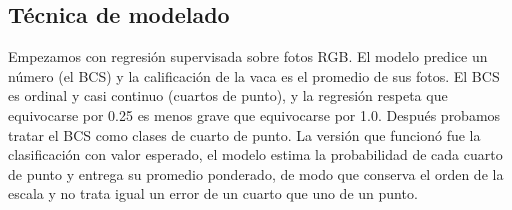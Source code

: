 \subsection{Técnica de modelado}

Empezamos con regresión supervisada sobre fotos RGB. El modelo predice un número (el BCS) y la calificación de la vaca es el promedio de sus fotos. El BCS es ordinal y casi continuo (cuartos de punto), y la regresión respeta que equivocarse por 0.25 es menos grave que equivocarse por 1.0. Después probamos tratar el BCS como clases de cuarto de punto. La versión que funcionó fue la clasificación con valor esperado, el modelo estima la probabilidad de cada cuarto de punto y entrega su promedio ponderado, de modo que conserva el orden de la escala y no trata igual un error de un cuarto que uno de un punto.
